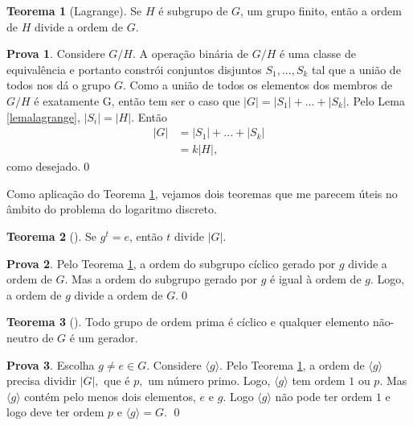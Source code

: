 \documentclass{article}
\theoremstyle{definition}
\newtheorem{theorem}{Teorema}[section]
\theoremstyle{pf}
\newtheorem*{pf}{Prova}
\newcommand{\reflema}[1]{Lema \ref{#1}}
\newcommand{\refth}[1]{Teorema \ref{#1}}
\newcommand{\thm}[1]{\jmp\begin{theorem}[#1]}
\newcommand{\mht}{\end{theorem}}
\newcommand{\prf}{\begin{pf}}
\newcommand{\frp}{\qed\end{pf}}
\newcommand{\jmp}{\vspace{3pt}}
\newcommand{\cyclic}[1]{\langle #1 \rangle}
\begin{document}
\thm{Lagrange} \label{lagrange} Se $H$ é subgrupo de $G$, um grupo
finito, então a ordem de $H$ divide a ordem de $G$.\mht

\prf Considere $G/H.$ A operação binária de $G/H$ é uma classe de
equivalência e portanto constrói conjuntos disjuntos $S_1, ..., S_k$
tal que a união de todos nos dá o grupo $G$. Como a união de todos os
elementos dos membros de $G/H$ é exatamente G, então tem ser o caso
que $|G| = |S_1| + ... + |S_k|$.  Pelo \reflema{lemalagrange}, $|S_i|
= |H|.$ Então %
\begin{align*}
        |G| &= |S_1| + ... + |S_k|\\
            &= k |H|,
\end{align*}
como desejado.\frp

Como aplicação do \refth{lagrange}, vejamos dois teoremas que me
parecem úteis no âmbito do problema do logaritmo discreto.

\thm{} Se $g^t = e$, então $t$ divide $|G|$. \mht

\prf Pelo \refth{lagrange}, a ordem do subgrupo cíclico gerado por $g$
divide a ordem de $G.$ Mas a ordem do subgrupo gerado por $g$ é igual
à ordem de $g.$ Logo, a ordem de $g$ divide a ordem de $G$\cite[página
  32, primeiro parágrafo]{scc}.\frp

\thm{} Todo grupo de ordem prima é cíclico e qualquer elemento 
não-neutro de $G$ é um gerador. \mht 

\prf Escolha $g \neq e \in G.$ Considere $\cyclic{g}.$ Pelo
\refth{lagrange}, a ordem de $\cyclic{g}$ precisa dividir $|G|,$ que é
$p,$ um número primo. Logo, $\cyclic{g}$ tem ordem $1$ ou $p.$ Mas
$\cyclic{g}$ contém pelo menos dois elementos, $e$ e $g.$ Logo
$\cyclic{g}$ não pode ter ordem $1$ e logo deve ter ordem $p$ e
$\cyclic{g} = G.$ \frp





\end{document}
